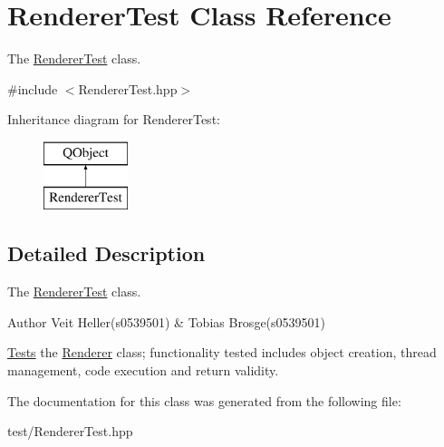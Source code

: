 \hypertarget{classRendererTest}{\section{Renderer\+Test Class Reference}
\label{classRendererTest}
}


The \hyperlink{classRendererTest}{Renderer\+Test} class.  




{\ttfamily \#include $<$Renderer\+Test.\+hpp$>$}

Inheritance diagram for Renderer\+Test\+:\begin{figure}[H]
\begin{center}
\leavevmode
\includegraphics[height=2.000000cm]{classRendererTest}
\end{center}
\end{figure}


\subsection{Detailed Description}
The \hyperlink{classRendererTest}{Renderer\+Test} class. 

\begin{DoxyAuthor}{Author}
Veit Heller(s0539501) \& Tobias Brosge(s0539501)
\end{DoxyAuthor}
\hyperlink{structTests}{Tests} the \hyperlink{classRenderer}{Renderer} class; functionality tested includes object creation, thread management, code execution and return validity. 

The documentation for this class was generated from the following file\+:\begin{DoxyCompactItemize}
\item 
test/Renderer\+Test.\+hpp\end{DoxyCompactItemize}
